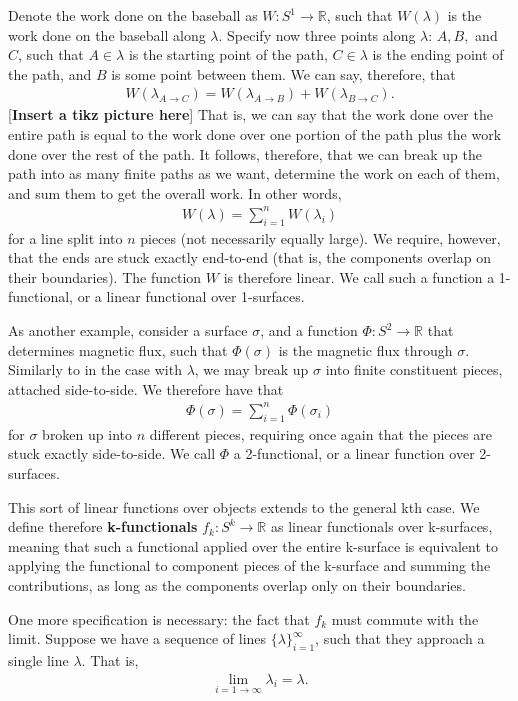 \documentclass{book}
\begin{document}
Denote the work done on the baseball as $W: S^1 \to \mathbb{R}$, such that $W(\lambda)$ is the work done on the baseball along $\lambda$. Specify now three points along $\lambda$: $A, B,$ and $C$, such that $A \in \lambda$ is the starting point of the path, $C \in \lambda$ is the ending point of the path, and $B$ is some point between them. We can say, therefore, that \begin{gather} W(\lambda_{A\to C}) = W(\lambda_{A \to B}) + W(\lambda_{B \to C}).\end{gather} [\textbf{Insert a tikz picture here}]
That is, we can say that the work done over the entire path is equal to the work done over one portion of the path plus the work done over the rest of the path. It follows, therefore, that we can break up the path into as many finite paths as we want, determine the work on each of them, and sum them to get the overall work. In other words, \begin{gather} W(\lambda) = \sum_{i=1}^{n} W(\lambda_i) \end{gather} for a line split into $n$ pieces (not necessarily equally large). We require, however, that the ends are stuck exactly end-to-end (that is, the components overlap on their boundaries). The function $W$ is therefore linear. We call such a function a 1-functional, or a linear functional over 1-surfaces. 

As another example, consider a surface $\sigma$, and a function $\Phi: S^2 \to \mathbb{R}$ that determines magnetic flux, such that $\Phi(\sigma)$ is the magnetic flux through $\sigma$. Similarly to in the case with $\lambda$, we may break up $\sigma$ into finite constituent pieces, attached side-to-side. We therefore have that \begin{gather} \Phi(\sigma) = \sum_{i=1}^n \Phi(\sigma_i) \end{gather} for $\sigma$ broken up into $n$ different pieces, requiring once again that the pieces are stuck exactly side-to-side. We call $\Phi$ a 2-functional, or a linear function over 2-surfaces. 

This sort of linear functions over objects extends to the general kth case. We define therefore \textbf{k-functionals} $f_k : S^k \to \mathbb{R}$ as linear functionals over k-surfaces, meaning that such a functional applied over the entire k-surface is equivalent to applying the functional to component pieces of the k-surface and summing the contributions, as long as the components overlap only on their boundaries. 


One more specification is necessary: the fact that $f_k$ must commute with the limit. Suppose we have a sequence of lines \textbf{$\{\lambda\}_{i=1}^\infty$}, such that they approach a single line $\lambda$. That is, \begin{gather} \lim_{i = 1 \to \infty} \lambda_i = \lambda. \end{gather} 
\end{document}
